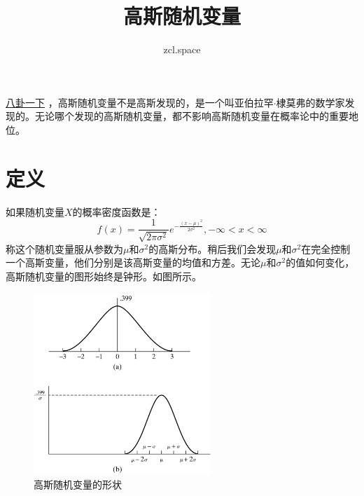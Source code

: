 \documentclass[11pt]{article}
\author{zcl.space}
\date{}
\title{高斯随机变量}
\begin{document}
\maketitle
\tableofcontents
{}
\href{afcp-normal-distribution-history.org}{八卦一下} ，高斯随机变量不是高斯发现的，是一个叫亚伯拉罕\(\cdot\)棣莫弗的数学家发现的。无论哪个发现的高斯随机变量，都不影响高斯随机变量在概率论中的重要地位。

\section{定义}
\label{sec:org0d4ea1f}


如果随机变量\(X\)的概率密度函数是：
\begin{equation}
\label{eq:1}
f(x) = \frac{1}{\sqrt{2\pi \sigma^{2}}}e^{-\frac{(x-\mu)^{2}}{2\sigma^{2}}}, -\infty < x < \infty
\end{equation}
称这个随机变量服从参数为\(\mu\)和\(\sigma^{2}\)的高斯分布。稍后我们会发现\(\mu\)和\(\sigma^{2}\)在完全控制一个高斯变量，他们分别是该高斯变量的均值和方差。无论\(\mu\)和\(\sigma^{2}\)的值如何变化，高斯随机变量的图形始终是钟形。如图所示。

\begin{figure}[htbp]
\centering
\includegraphics[width=0.6\textwidth]{../../img/math_probability/20170610figure5dot5gaussian.png}
\caption{\label{fig:org32b3e17}
高斯随机变量的形状}
\end{figure}
\end{document}
